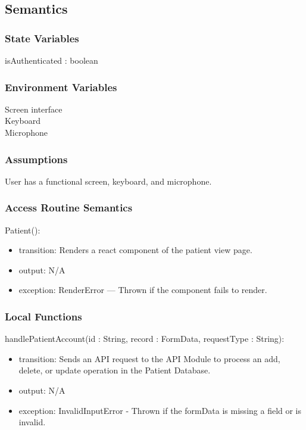 \documentclass[12pt, titlepage]{article}
\begin{document}
\subsection{Semantics}

\subsubsection{State Variables}
isAuthenticated : boolean

\subsubsection{Environment Variables}
Screen interface\\
Keyboard\\
Microphone\\

\subsubsection{Assumptions}
User has a functional screen, keyboard, and microphone.

\subsubsection{Access Routine Semantics}

\noindent Patient():
\begin{itemize}
\item transition: Renders a react component of the patient view page.
\item output: N/A
\item exception: RenderError — Thrown if the component fails to render.
\end{itemize}

\subsubsection{Local Functions}

\noindent handlePatientAccount(id : String, record : FormData, requestType : String):
\begin{itemize}
\item transition: Sends an API request to the API Module to process an add, delete, or update operation in the Patient Database.
\item output: N/A
\item exception: InvalidInputError - Thrown if the formData is missing a field or is invalid.
\end{itemize}
\end{document}

